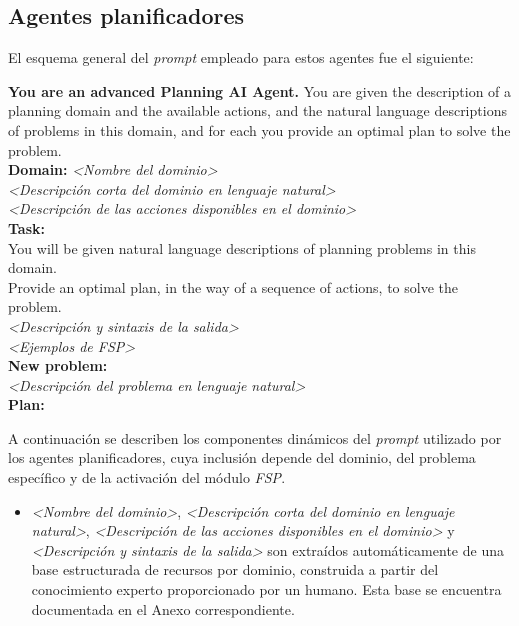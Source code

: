 \begin{anexes}

\section*{Agentes planificadores}

El esquema general del \textit{prompt} empleado para estos agentes fue el siguiente:

\begin{tcolorbox}[colback=gray!10!white, colframe=black, title=\textit{Prompt} genérico del agente planificador, fonttitle=\bfseries, breakable]
\textbf{You are an advanced Planning AI Agent.} You are given the description of a planning domain and the available actions, and the natural language descriptions of problems in this domain, and for each you provide an optimal plan to solve the problem.\\

\textbf{Domain:} \textit{<Nombre del dominio>} \\
\textit{<Descripción corta del dominio en lenguaje natural>}\\

\textit{<Descripción de las acciones disponibles en el dominio>}\\

\textbf{Task:} \\
You will be given natural language descriptions of planning problems in this domain. \\
Provide an optimal plan, in the way of a sequence of actions, to solve the problem.\\

\textit{<Descripción y sintaxis de la salida>}\\

\textit{<Ejemplos de FSP>}\\

\textbf{New problem:} \\
\textit{<Descripción del problema en lenguaje natural>}\\

\textbf{Plan:}
\end{tcolorbox}

A continuación se describen los componentes dinámicos del \textit{prompt} utilizado por los agentes planificadores, cuya inclusión depende del dominio, del problema específico y de la activación del módulo \textit{FSP}.

\begin{itemize}
    \item \textit{<Nombre del dominio>}, \textit{<Descripción corta del dominio en lenguaje natural>}, \textit{<Descripción de las acciones disponibles en el dominio>} y \textit{<Descripción y sintaxis de la salida>} son extraídos automáticamente de una base estructurada de recursos por dominio, construida a partir del conocimiento experto proporcionado por un humano. Esta base se encuentra documentada en el Anexo correspondiente.


\end{itemize}
\end{anexes}
